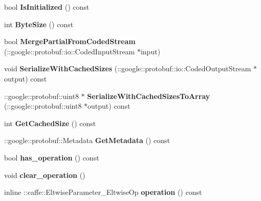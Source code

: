 \begin{DoxyCompactItemize}
bool {\bfseries Is\+Initialized} () const
\item 
\mbox{\label{classcaffe_1_1_eltwise_parameter_a15397b5fa4932782c97b83f06505fe10}} 
int {\bfseries Byte\+Size} () const
\item 
\mbox{\label{classcaffe_1_1_eltwise_parameter_aaf6aaab4e4e51276fbaba244b6a3a6a5}} 
bool {\bfseries Merge\+Partial\+From\+Coded\+Stream} (\+::google\+::protobuf\+::io\+::\+Coded\+Input\+Stream $\ast$input)
\item 
\mbox{\label{classcaffe_1_1_eltwise_parameter_ad51725f1aafd0b490b1eab81c1f6f254}} 
void {\bfseries Serialize\+With\+Cached\+Sizes} (\+::google\+::protobuf\+::io\+::\+Coded\+Output\+Stream $\ast$output) const
\item 
\mbox{\label{classcaffe_1_1_eltwise_parameter_ad7a4931fa1729d0bd8be45a5be081397}} 
\+::google\+::protobuf\+::uint8 $\ast$ {\bfseries Serialize\+With\+Cached\+Sizes\+To\+Array} (\+::google\+::protobuf\+::uint8 $\ast$output) const
\item 
\mbox{\label{classcaffe_1_1_eltwise_parameter_a4f57942b94300366f8051a54ad1d8374}} 
int {\bfseries Get\+Cached\+Size} () const
\item 
\mbox{\label{classcaffe_1_1_eltwise_parameter_a2b1d665f0d0e5955306a26691dc7609d}} 
\+::google\+::protobuf\+::\+Metadata {\bfseries Get\+Metadata} () const
\item 
\mbox{\label{classcaffe_1_1_eltwise_parameter_abc6d193903c5dc36ee711135a8277983}} 
bool {\bfseries has\+\_\+operation} () const
\item 
\mbox{\label{classcaffe_1_1_eltwise_parameter_a02095e77f6a2e6afb711e7999444c8cd}} 
void {\bfseries clear\+\_\+operation} ()
\item 
\mbox{\label{classcaffe_1_1_eltwise_parameter_ad1165eef359b6a72a98f814021075188}} 
inline \+::caffe\+::\+Eltwise\+Parameter\+\_\+\+Eltwise\+Op {\bfseries operation} () const

\end{DoxyCompactItemize}
